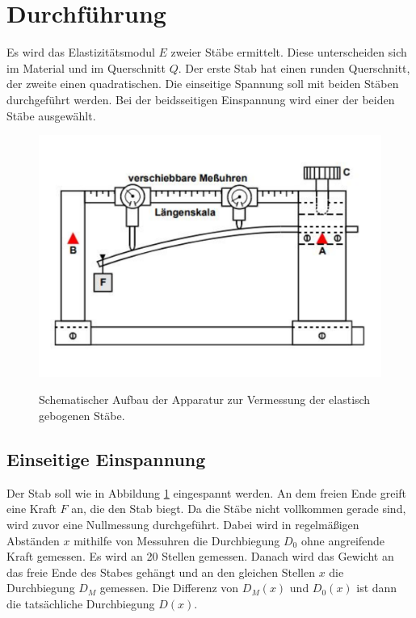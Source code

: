 \section{Durchführung}
\label{sec:Durchführung}
Es wird das Elastizitätsmodul $E$ zweier Stäbe ermittelt.
Diese unterscheiden sich im Material und im Querschnitt $Q$.
Der erste Stab hat einen runden Querschnitt, der zweite einen quadratischen.
Die einseitige Spannung soll mit beiden Stäben durchgeführt werden.
Bei der beidsseitigen Einspannung wird einer der beiden Stäbe ausgewählt.
\begin{figure}
    \centering
    \includegraphics[width=\textwidth]{Messapparat.pdf} \cite{anleitung}
    \caption{Schematischer Aufbau der Apparatur zur Vermessung der elastisch gebogenen Stäbe.}
    \label{fig:Messapparat}
\end{figure}
\subsection{Einseitige Einspannung}
\label{subsec:einseitigeEinspannung}
Der Stab soll wie in Abbildung \ref{fig:Messapparat} eingespannt werden.
An dem freien Ende greift eine Kraft $F$ an, die den Stab biegt.
Da die Stäbe nicht vollkommen gerade sind, wird zuvor eine Nullmessung durchgeführt.
Dabei wird in regelmäßigen Abständen $x$ mithilfe von Messuhren die Durchbiegung $D_0$ ohne angreifende Kraft gemessen.
Es wird an 20 Stellen gemessen.
Danach wird das Gewicht an das freie Ende des Stabes gehängt und an den gleichen Stellen $x$ die Durchbiegung $D_M$ gemessen.
Die Differenz von $D_M(x)$ und $D_0(x)$ ist dann die tatsächliche Durchbiegung $D(x)$.


